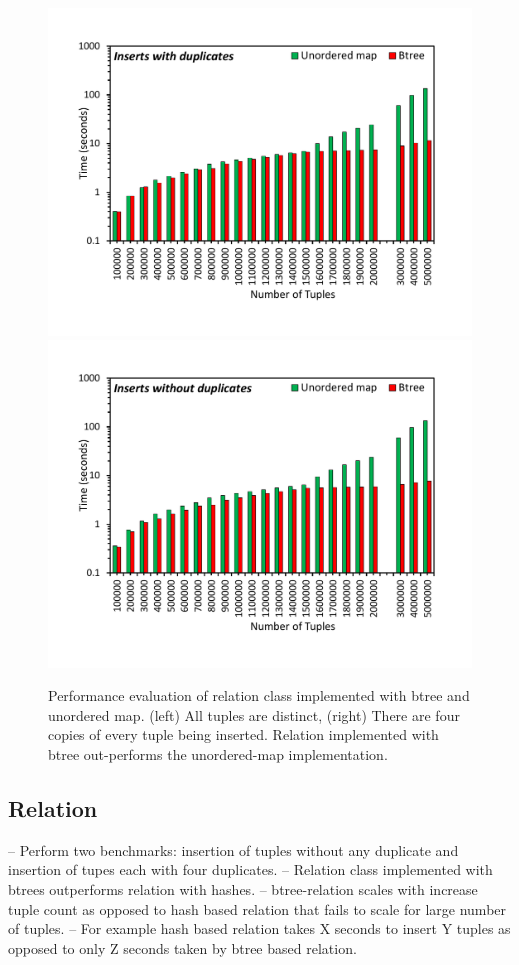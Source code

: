 \begin{figure}[t]
	{\includegraphics[width=.50\textwidth,  trim={0cm 0cm 0cm 0cm, 
			clip}]{results/inserts_with_duplicates.pdf}}\hfill%
	{\includegraphics[width=.50\textwidth,  trim={0cm 0cm 0cm 0cm,
			clip}]{results/inserts_with_no_duplicates.pdf}}\hfill%
	\centering
	\caption{Performance evaluation of relation class implemented with btree and unordered map. (left) All tuples are distinct, (right) There are four copies of every tuple being inserted. Relation implemented with btree out-performs the unordered-map implementation.}
	\label{fig:tuple_inserts}
\end{figure}


\subsection{Relation}
\label{sec:relation}
-- Perform two benchmarks: insertion of tuples without any duplicate and insertion of tupes each with four duplicates.
-- Relation class implemented with btrees outperforms relation with hashes.
-- btree-relation scales with increase tuple count as opposed to hash based relation that fails to scale for large number of tuples.
-- For example hash based relation takes X seconds to insert Y tuples as opposed to only Z seconds taken by btree based relation.



